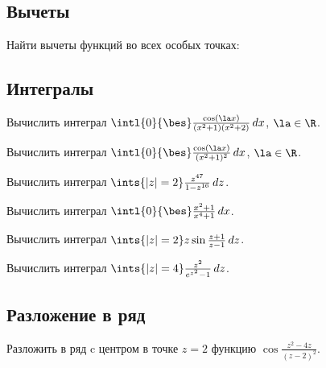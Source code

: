 \documentclass[a4paper]{article}
\begin{document}
\subsection{Вычеты}

Найти вычеты функций во всех особых точках:


\subsection{Интегралы}

\begin{problem}
Вычислить интеграл $\intl{0}{\bes}\frac{\cos(\la x)}{(x^2+1)(x^2+2)}\,dx$, $\la \in \R$.
\end{problem}

\begin{problem}
Вычислить интеграл $\intl{0}{\bes}\frac{\cos(\la x)}{(x^2+1)^2}\,dx$, $\la \in \R$.
\end{problem}


\begin{problem}
Вычислить интеграл $\ints{|z|=2}\frac{z^{47}}{1-z^{16}}\,dz$.
\end{problem}

\begin{problem}
Вычислить интеграл $\intl{0}{\bes}\frac{x^2+1}{x^4+1}\,dx$.
\end{problem}

\begin{problem}
Вычислить интеграл $\ints{|z|=2}z\sin\frac{z+1}{z-1}\,dz$.
\end{problem}

\begin{problem}
Вычислить интеграл $\ints{|z|=4}\frac{z^2}{e^{z^2}-1}\,dz$.
\end{problem}


\subsection{Разложение в ряд}

\begin{problem}
Разложить в ряд c центром в точке $z=2$ функцию $\cos \frac{z^2-4z}{(z-2)^2}$.
\end{problem}
\end{document}
